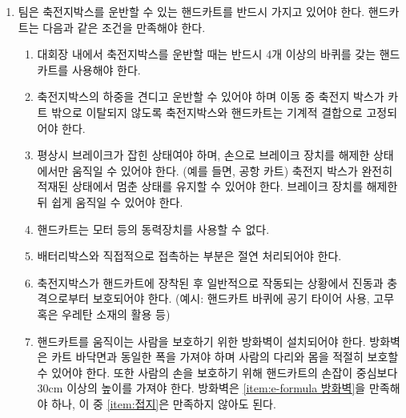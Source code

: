 \documentclass[final,a4paper,10pt]{report}
\begin{document}
\begin{enumerate}
\begin{enumerate}
      \item\label{rule:formula-technical.ts-maintenance-charging.charging-sdc.shutdown-circuit-compliance} \ref{item:차단 회로 전류}, \ref{item:차단 회로 전원 차단}, \ref{item:차단 회로 입증}을 만족해야 한다.
    \end{enumerate}

  \item\label{rule:formula-technical.ts-maintenance-charging.hand-cart} 팀은 축전지박스를 운반할 수 있는 핸드카트를 반드시 가지고 있어야 한다. 핸드카트는 다음과 같은 조건을 만족해야 한다.
    \begin{enumerate}
      \item\label{rule:formula-technical.ts-maintenance-charging.hand-cart.min-four-wheels} 대회장 내에서 축전지박스를 운반할 때는 반드시 4개 이상의 바퀴를 갖는 핸드카트를 사용해야 한다.
      \item\label{rule:formula-technical.ts-maintenance-charging.hand-cart.secured-load-bearing-mount} 축전지박스의 하중을 견디고 운반할 수 있어야 하며 이동 중 축전지 박스가 카트 밖으로 이탈되지 않도록 축전지박스와 핸드카트는 기계적 결합으로 고정되어야 한다.
      \item\label{rule:formula-technical.ts-maintenance-charging.hand-cart.default-engaged-brake} 평상시 브레이크가 잡힌 상태여야 하며, 손으로 브레이크 장치를 해제한 상태에서만 움직일 수 있어야 한다. (예를 들면, 공항 카트) 축전지 박스가 완전히 적재된 상태에서 멈춘 상태를 유지할 수 있어야 한다. 브레이크 장치를 해제한 뒤 쉽게 움직일 수 있어야 한다.
      \item\label{rule:formula-technical.ts-maintenance-charging.hand-cart.no-motorized-drive} 핸드카트는 모터 등의 동력장치를 사용할 수 없다.
      \item\label{rule:formula-technical.ts-maintenance-charging.hand-cart.insulated-contact-surfaces} 배터리박스와 직접적으로 접촉하는 부분은 절연 처리되어야 한다.
      \item\label{rule:formula-technical.ts-maintenance-charging.hand-cart.vibration-shock-protection} 축전지박스가 핸드카트에 장착된 후 일반적으로 작동되는 상황에서 진동과 충격으로부터 보호되어야 한다. (예시: 핸드카트 바퀴에 공기 타이어 사용, 고무 혹은 우레탄 소재의 활용 등)
      \item\label{rule:formula-technical.ts-maintenance-charging.hand-cart.operator-firewall-30cm-clearance} 핸드카트를 움직이는 사람을 보호하기 위한 방화벽이 설치되어야 한다. 방화벽은 카트 바닥면과 동일한 폭을 가져야 하며 사람의 다리와 몸을 적절히 보호할 수 있어야 한다. 또한 사람의 손을 보호하기 위해 핸드카트의 손잡이 중심보다 30cm 이상의 높이를 가져야 한다. 방화벽은 \ref{item:e-formula 방화벽}을 만족해야 하나, 이 중 \ref{item:접지}은 만족하지 않아도 된다.
    \end{enumerate}
\end{enumerate}
\end{document}
